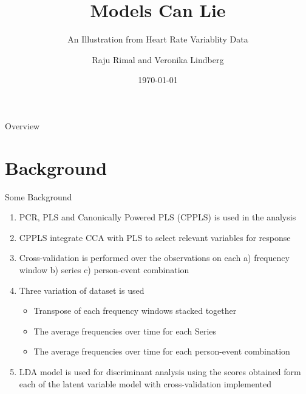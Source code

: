 \documentclass[newPxFont]{beamer}\usepackage[]{graphicx}\usepackage[]{color}
\title{Models Can Lie}
\subtitle{An Illustration from Heart Rate Variablity Data}
\date{\today}
\author{Raju Rimal and Veronika Lindberg}
\institute{Norwegian University of Science and Technology \\
\large{Norwegian University of Life Sciences}}
\begin{document}
%
%

\maketitle

%
%





%
%
\begin{frame}{Overview}
\tableofcontents
\end{frame}

\section{Background}
\begin{frame}[c, fragile]{Some Background}
\begin{enumerate}[<+->]
  \item PCR, PLS and Canonically Powered PLS (CPPLS) is used in the analysis
  \item CPPLS integrate CCA with PLS to select relevant variables for response
  \item Cross-validation is performed over the observations on each a) frequency window b) series c) person-event combination
  \item Three variation of dataset is used
  \begin{itemize}
   \item Transpose of each frequency windows stacked together
   \item The average frequencies over time for each Series
   \item The average frequencies over time for each person-event combination
  \end{itemize}
  \item LDA model is used for discriminant analysis using the scores obtained form each of the latent variable model with cross-validation implemented
\end{enumerate}
\end{frame}
\end{document}
